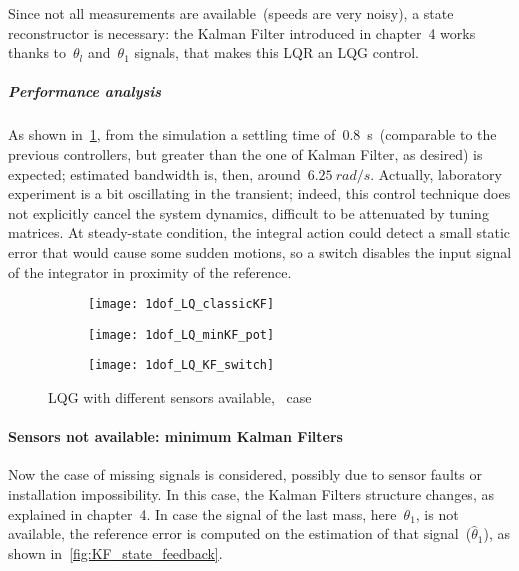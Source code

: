  Since not all measurements are available~(speeds are very noisy), a state reconstructor is necessary: the Kalman Filter introduced in chapter~4 works thanks to~$\theta_l$ and~$\theta_1$ signals, that makes this LQR an LQG control.
 \subparagraph{Performance analysis}
 As shown in~\cref{fig:1dof_LQ_classicKF}, from the simulation a settling time of~0.8~s~(comparable to the previous controllers, but greater than the one of Kalman Filter, as desired) is expected; estimated bandwidth is, then, around~$6.25\ rad/s$. Actually, laboratory experiment is a bit oscillating in the transient; indeed, this control technique does not explicitly cancel the system dynamics, difficult to be attenuated by tuning matrices. At steady-state condition, the integral action could detect a small static error that would cause some sudden motions, so a switch disables the input signal of the integrator in proximity of the reference.

\begin{figure*}
	\centering
	\begin{subfigure}{0.45\columnwidth}
		\texttt{[image: 1dof\_LQ\_classicKF]}
		\label{fig:1dof_LQ_classicKF}
	\end{subfigure}
	\begin{subfigure}{0.45\columnwidth}
		\texttt{[image: 1dof\_LQ\_minKF\_pot]}
		\label{fig:1dof_LQ_minKF_pot}
	\end{subfigure}
	\newline
	\begin{subfigure}{\columnwidth}
		\centering
		\texttt{[image: 1dof\_LQ\_KF\_switch]}
		\label{fig:1dof_LQ_KF_switch}
	\end{subfigure}
	\caption{LQG with different sensors available, \onedof\ case}
\end{figure*}

\paragraph{Sensors not available: minimum Kalman Filters}

Now the case of missing signals is considered, possibly due to sensor faults or installation impossibility. In this case, the Kalman Filters structure changes, as explained in chapter~4. In case the signal of the last mass, here~$\theta_1$, is not available, the reference error is computed on the estimation of that signal~($\hat\theta_1$), as shown in~\cref{fig:KF_state_feedback}. \\

